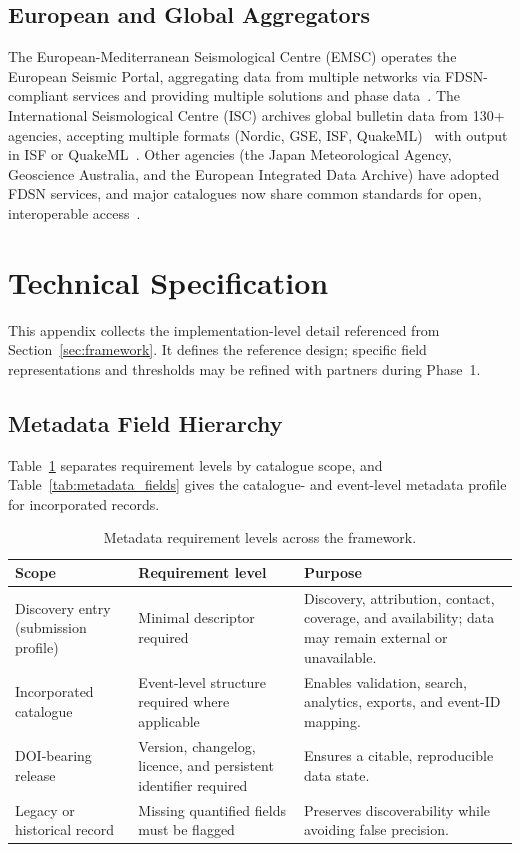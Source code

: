 \documentclass[11pt]{article}
\begin{document}
\subsection{European and Global Aggregators}
The European-Mediterranean Seismological Centre (EMSC) operates the European Seismic Portal, aggregating data from multiple networks via FDSN-compliant services and providing multiple solutions and phase data~\citep{emsc_home,emsc_webservices}. The International Seismological Centre (ISC) archives global bulletin data from 130+ agencies, accepting multiple formats (Nordic, GSE, ISF, QuakeML)~\citep{isc_data_collection} with output in ISF or QuakeML~\citep{isc_bulletin}. Other agencies (the Japan Meteorological Agency, Geoscience Australia, and the European Integrated Data Archive) have adopted FDSN services, and major catalogues now share common standards for open, interoperable access~\citep{EPOSSeisTCS,QuakeML}.

\section{Technical Specification}
\label{app:spec}
This appendix collects the implementation-level detail referenced from Section~\ref{sec:framework}. It defines the reference design; specific field representations and thresholds may be refined with partners during Phase~1.

\subsection{Metadata Field Hierarchy}
Table~\ref{tab:metadata_scope} separates requirement levels by catalogue scope, and Table~\ref{tab:metadata_fields} gives the catalogue- and event-level metadata profile for incorporated records.

\begin{table}[H]
\centering
\small
\caption{Metadata requirement levels across the framework.}
\label{tab:metadata_scope}
\setlength{\tabcolsep}{5pt}
\renewcommand{\arraystretch}{1.15}
\begin{tabular}{p{3.0cm} p{3.5cm} p{6.2cm}}
\toprule
\textbf{Scope} & \textbf{Requirement level} & \textbf{Purpose} \\
\midrule
Discovery entry (submission profile) & Minimal descriptor required & Discovery, attribution, contact, coverage, and availability; data may remain external or unavailable. \\
Incorporated catalogue & Event-level structure required where applicable & Enables validation, search, analytics, exports, and event-ID mapping. \\
DOI-bearing release & Version, changelog, licence, and persistent identifier required & Ensures a citable, reproducible data state. \\
Legacy or historical record & Missing quantified fields must be flagged & Preserves discoverability while avoiding false precision. \\
\bottomrule
\end{tabular}
\end{table}
\end{document}
